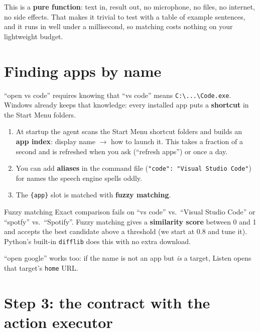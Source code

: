 \documentclass[11pt,a4paper]{article}
\begin{document}
\begin{why}
This is a \textbf{pure function}: text in, result out, no microphone, no files, no internet,
no side effects. That makes it trivial to test with a table of example sentences, and it runs
in well under a millisecond, so matching costs nothing on your lightweight budget.
\end{why}

\section{Finding apps by name}\label{sec:apps}

``open vs code'' requires knowing that ``vs code'' means
\texttt{C:\textbackslash...\textbackslash Code.exe}. Windows already keeps that knowledge: every
installed app puts a \textbf{shortcut} in the Start Menu folders.

\begin{enumerate}[nosep]
  \item At startup the agent scans the Start Menu shortcut folders and builds an
        \textbf{app index}: display name $\to$ how to launch it. This takes a fraction of a
        second and is refreshed when you ask (``refresh apps'') or once a day.
  \item You can add \textbf{aliases} in the command file (\texttt{"code": "Visual Studio
        Code"}) for names the speech engine spells oddly.
  \item The \texttt{\{app\}} slot is matched with \textbf{fuzzy matching}.
\end{enumerate}

\begin{concept}{Fuzzy matching}
Exact comparison fails on ``vs code'' vs.\ ``Visual Studio Code'' or ``spotfy'' vs.\
``Spotify''. Fuzzy matching gives a \textbf{similarity score} between 0 and 1 and accepts the
best candidate above a threshold (we start at 0.8 and tune it). Python's built-in
\texttt{difflib} does this with no extra download.
\end{concept}

\noindent ``open google'' works too: if the name is not an app but \emph{is} a target, Listen
opens that target's \texttt{home} URL.

\section{Step 3: the contract with the action executor}
\end{document}
